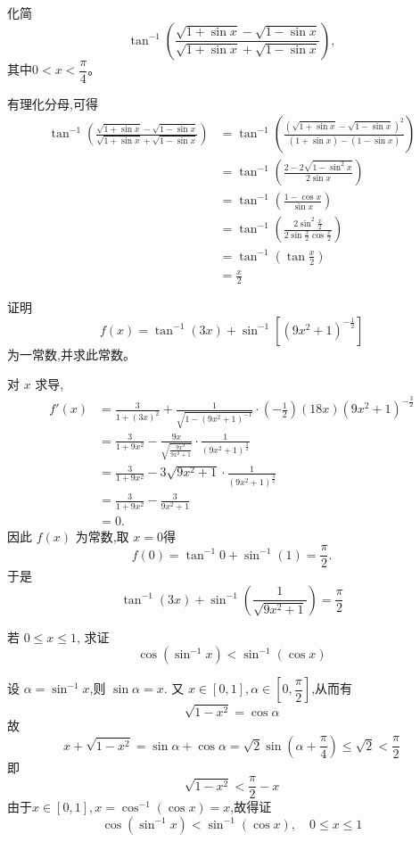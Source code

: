\begin{questions}
    \question 化简
    \[
    \tan^{-1} \left( \frac{\sqrt{1+\sin x} - \sqrt{1-\sin x}}{\sqrt{1+\sin x} + \sqrt{1-\sin x}} \right), 
    \]
    其中$0 < x < \dfrac{\pi}{4}$。
    \begin{solution}
        有理化分母,可得
        \begin{align*}
        \tan^{-1} \left( \frac{\sqrt{1+\sin x} - \sqrt{1-\sin x}}{\sqrt{1+\sin x} + \sqrt{1-\sin x}} \right) 
        &= \tan^{-1} \left( \frac{(\sqrt{1+\sin x} - \sqrt{1-\sin x})^2}{(1+\sin x) - (1-\sin x)} \right) \\
        &= \tan^{-1} \left( \frac{2 - 2\sqrt{1-\sin^2 x}}{2\sin x} \right) \\
        &= \tan^{-1} \left( \frac{1 - \cos x}{\sin x} \right) \\
        &= \tan^{-1} \left( \frac{2\sin^2 \frac{x}{2}}{2\sin \frac{x}{2} \cos \frac{x}{2}} \right) \\
        &= \tan^{-1} \left(\tan \frac{x}{2}\right) \\
        &= \frac{x}{2}
        \end{align*}
    \end{solution}

    \question 证明
    \[ 
    f(x) = \tan^{-1} (3x) + \sin^{-1} \left[(9x^2+1)^{-\frac{1}{2}}\right] 
    \]
    为一常数,并求此常数。
    \begin{solution}
        对 $x$ 求导,
        \begin{align*}
        f'(x)
        &=\frac{3}{1+(3x)^2}
        +\frac{1}{\sqrt{1-(9x^2+1)^{-1}}}
        \cdot\left(-\frac{1}{2}\right)(18x)(9x^2+1)^{-\frac{3}{2}} \\
        &=\frac{3}{1+9x^2}
        -\frac{9x}{\sqrt{\frac{9x^2}{9x^2+1}}}\cdot\frac{1}{(9x^2+1)^{\frac{3}{2}}} \\
        &=\frac{3}{1+9x^2}
        -3\sqrt{9x^2+1}\cdot\frac{1}{(9x^2+1)^{\frac{3}{2}}} \\
        &=\frac{3}{1+9x^2}-\frac{3}{9x^2+1} \\
        &=0.
        \end{align*}
        因此 $f(x)$ 为常数,取 $x=0$得
        \[
        f(0)=\tan^{-1}0+\sin^{-1}(1)=\frac{\pi}{2}.
        \]
        于是
        \[
        \tan^{-1}(3x)+\sin^{-1}\!\left(\frac{1}{\sqrt{9x^2+1}}\right)=\frac{\pi}{2}
        \]
    \end{solution}

    \question 若 $0 \le x \le 1$, 求证
    \[
    \cos(\sin^{-1} x) < \sin^{-1}(\cos x)
    \]
    \begin{solution}
        设 $\alpha = \sin^{-1} x$,则 $\sin\alpha = x$. 又 $x \in [0, 1],\alpha \in \left[0, \dfrac{\pi}{2}\right]$,从而有 
        \[
        \sqrt{1-x^2} = \cos\alpha
        \]
        故
        \[ x+\sqrt{1-x^2} = \sin\alpha + \cos\alpha = \sqrt{2} \sin\left(\alpha + \frac{\pi}{4}\right) \le \sqrt{2} < \frac{\pi}{2}
        \]
        即 
        \[
        \sqrt{1-x^2} < \frac{\pi}{2} - x
        \]
        由于$x \in [0, 1],x=\cos^{-1}(\cos x) =x$,故得证 
        \[
        \cos(\sin^{-1} x) < \sin^{-1}(\cos x),\quad 0 \le x \le 1
        \]
    \end{solution}


\end{questions}
